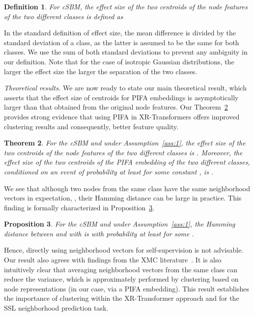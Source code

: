 \documentclass{article} \usepackage{iclr2022_conference,times}
\newtheorem{theorem}{Theorem}[section]
\newtheorem{definition}[theorem]{Definition}
\newtheorem{proposition}[theorem]{Proposition}
\begin{document}
\begin{definition}\label{def:eff_size}
	For cSBM, the effect size of the two centroids of the node features  of the two different classes is defined as
	
\end{definition}
In the standard definition of effect size, the mean difference is divided by the standard deviation of a class, as the latter is assumed to be the same for both classes. We use the sum of both standard deviations to prevent any ambiguity in our definition. Note that for the case of isotropic Gaussian distributions, the larger the effect size the larger the separation of the two classes.

\textit{Theoretical results. }We are now ready to state our main theoretical result, which asserts that the effect size of centroids for PIFA embeddings  is asymptotically larger than that obtained from the original node features. Our Theorem~\ref{thm:main} provides strong evidence that using PIFA in XR-Transformers offers improved clustering results and consequently, better feature quality.
\begin{theorem}\label{thm:main}
	For the cSBM and under Assumption~\ref{ass:1}, the effect size of the two centroids of the node features  of the two different classes is . Moreover, the effect size of the two centroids of the PIFA embedding  of the two different classes, conditioned on an event of probability at least  for some constant , is .
\end{theorem}
We see that although two nodes  from the same class have the same neighborhood vectors in expectation, , their Hamming distance can be large in practice. This finding is formally characterized in Proposition~\ref{prop:Bino}.
\begin{proposition}\label{prop:Bino}
	For the cSBM and under Assumption~\ref{ass:1}, the Hamming distance between  and  with  is  with probability at least  for some .
\end{proposition}
Hence, directly using neighborhood vectors for self-supervision is not advisable. Our result also agrees with findings from the XMC literature~\citep{chang2020taming}. It is also intuitively clear that averaging neighborhood vectors from the same class can reduce the variance, which is approximately performed by clustering based on node representations (in our case, via a PIFA embedding). This result establishes the importance of clustering within the XR-Transformer approach and for the SSL neighborhood prediction task.
\end{document}
